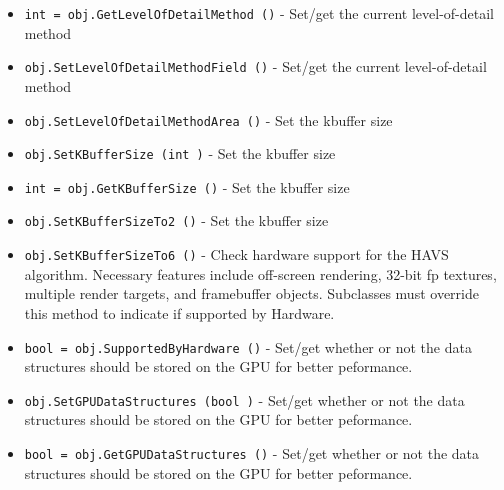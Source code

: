 \begin{itemize}
\item  \verb|int = obj.GetLevelOfDetailMethod ()| -  Set/get the current level-of-detail method

\item  \verb|obj.SetLevelOfDetailMethodField ()| -  Set/get the current level-of-detail method

\item  \verb|obj.SetLevelOfDetailMethodArea ()| -  Set the kbuffer size

\item  \verb|obj.SetKBufferSize (int )| -  Set the kbuffer size

\item  \verb|int = obj.GetKBufferSize ()| -  Set the kbuffer size

\item  \verb|obj.SetKBufferSizeTo2 ()| -  Set the kbuffer size

\item  \verb|obj.SetKBufferSizeTo6 ()| -  Check hardware support for the HAVS algorithm.  Necessary
 features include off-screen rendering, 32-bit fp textures, multiple
 render targets, and framebuffer objects.
 Subclasses must override this method to indicate if supported by Hardware.

\item  \verb|bool = obj.SupportedByHardware ()| -  Set/get whether or not the data structures should be stored on the GPU 
 for better peformance.

\item  \verb|obj.SetGPUDataStructures (bool )| -  Set/get whether or not the data structures should be stored on the GPU 
 for better peformance.

\item  \verb|bool = obj.GetGPUDataStructures ()| -  Set/get whether or not the data structures should be stored on the GPU 
 for better peformance.

\end{itemize}
